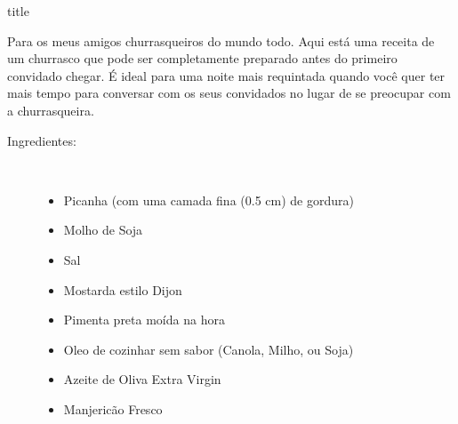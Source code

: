 \documentclass [11pt, letterpaper] {article}
\begin{document}
 {title}

Para os meus amigos churrasqueiros do mundo todo. Aqui est\'a uma receita de um churrasco que pode ser completamente preparado antes do primeiro convidado chegar. \'E ideal para uma noite mais requintada quando voc\^e quer ter mais tempo para conversar com os seus convidados no lugar de se preocupar com a churrasqueira.

\begin{description}

\item[Ingredientes:]\ \\
	\begin{itemize}
	\item Picanha (com uma camada fina (0.5 cm) de gordura)
	\item Molho de Soja
	\item Sal
	\item Mostarda estilo Dijon 
	\item Pimenta preta mo\'{i}da na hora 
	\item Oleo de cozinhar sem sabor (Canola, Milho, ou Soja) 
	\item Azeite de Oliva Extra Virgin
	\item Manjeric\~ao Fresco 
	\end{itemize}


\end{description}
\end{document}
